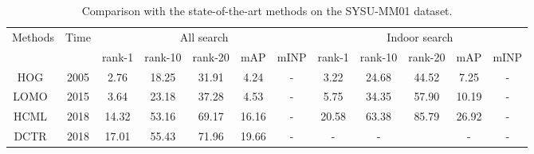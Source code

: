 \documentclass[journal]{IEEEtran}
\begin{document}
\begin{table*}[]
	\centering
	\small 
	\caption{Comparison with the state-of-the-art methods on the SYSU-MM01 dataset.}
	\label{tab sysu}
	
	\begin{tabular}{c|c|ccccc|ccccc}
		\hline
		\multirow{2}{*}{Methods} & \multirow{2}{*}{Time} & \multicolumn{5}{c|}{All search}                                                                                                       & \multicolumn{5}{c}{Indoor search}                                                                                                     \\ \cline{3-12} 
		&                       & \multicolumn{1}{c|}{rank-1} & \multicolumn{1}{c|}{rank-10} & \multicolumn{1}{c|}{rank-20} & \multicolumn{1}{c|}{mAP} & mINP           & \multicolumn{1}{c|}{rank-1} & \multicolumn{1}{c|}{rank-10} & \multicolumn{1}{c|}{rank-20} & \multicolumn{1}{c|}{mAP} & mINP           \\ \hline
		HOG~\cite{dalal2005histograms}                      & 2005                  & 2.76                        & 18.25                        & 31.91                        & 4.24                     & -              & 3.22                        & 24.68                        & 44.52                        & 7.25                     & -              \\ \hline
		LOMO~\cite{liao2015person}                     & 2015                  & 3.64                        & 23.18                        & 37.28                        & 4.53                     & -              & 5.75                        & 34.35                        & 57.90                        & 10.19                    & -              \\ \hline
		HCML~\cite{ye2018hierarchical}                     & 2018                  & 14.32                       & 53.16                        & 69.17                        & 16.16                    & -              & 20.58                       & 63.38                        & 85.79                        & 26.92                    & -              \\
		DCTR~\cite{ye2018visible}                     & 2018                  & 17.01                       & 55.43                        & 71.96                        & 19.66                    & -              & -                           & -                            &                              & -                        & -              \\

\end{tabular}
\end{table*}
\end{document}
